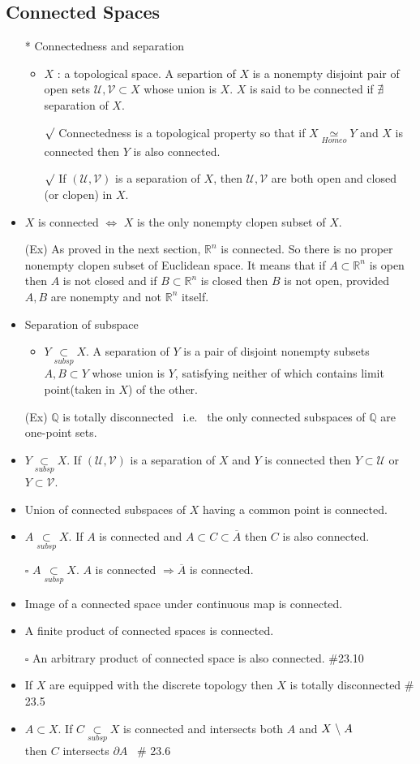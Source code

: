 \documentclass[12pt]{article}
\newcommand{\sq}{$\square$}
\newcommand{\rmk}{$\surd$}
\newcommand{\spone}{\hspace{0.1cm}}
\newcommand{\Real}{\mathbb{R}}
\newcommand{\U}{\mathcal{U}}
\newcommand{\V}{\mathcal{V}}
\newcommand{\subsp}{\underset{subsp}{\subset}}
\newcommand{\cl}{\overline}
\newcommand{\diff}{\spone\backslash\spone}
\newcommand{\homeo}{\underset{Homeo}{\simeq}}
\begin{document}
\subsection{Connected Spaces}
\smallskip
\begin{itemize}
	\item[*] Connectedness and separation
	\begin{itemize}
		\item $X$ : a topological space. A separtion of $X$ is a nonempty disjoint pair of open sets $\U, \V \subset X$ whose union is $X$. $X$ is said to be connected if $\nexists \,$ separation of $X$.
		\item[\rmk] Connectedness is a topological property so that if $X\homeo Y$ and $X$ is connected then $Y$ is also connected.
		\item[\rmk] If $(\U,\V)$ is a separation of $X$, then $\U, \V$ are both open and closed (or clopen) in $X$. 
	\end{itemize}
	\item $X$ is connected $\Leftrightarrow$ $X$ is the only nonempty clopen subset of $X$.
	\item[(Ex)] As proved in the next section, $\Real^n$ is connected. So there is no proper nonempty clopen subset of Euclidean space. It means that if $A\subset \Real^n$ is open then $A$ is not closed and if $B\subset \Real^n$ is closed then $B$ is not open, provided $A,B$ are nonempty and not $\Real^n$ itself.
	\item Separation of subspace
	\begin{itemize}
		\item $Y\subsp X$. A separation of $Y$ is a pair of disjoint nonempty subsets $A,B\subset Y$ whose union is $Y$, satisfying neither of which contains limit point(taken in $X$) of the other.
	\end{itemize} 
	\item[(Ex)] $\mathbb{Q}$ is totally disconnected \, i.e. \, the only connected subspaces of $\mathbb{Q}$ are one-point sets.
	\item $Y\subsp X$. If $(\U, \V)$ is a separation of $X$ and $Y$ is connected then $Y\subset\U$ or $Y\subset\V$. 
	\item Union of connected subspaces of $X$ having a common point is connected.
	\item $A\subsp X$. If $A$ is connected and $A\subset C \subset \cl{A}$ then $C$ is also connected.
	\item[\sq] $A\subsp X$. $A$ is connected $\Rightarrow \cl{A}$ is connected.
	\item Image of a connected space under continuous map is connected.
	\item A finite product of connected spaces is connected.
	\item[\sq] An arbitrary product of connected space is also connected. \; \#23.10 
	\item If $X$ are equipped with the discrete topology then $X$ is totally disconnected \quad \# 23.5
	\item $A\subset X$. If $C\subsp X$ is connected and intersects both $A$ and $X\diff A$\\ then $C$ intersects $\partial A$ \, \# 23.6
\end{itemize}
\bigskip
\end{document}
